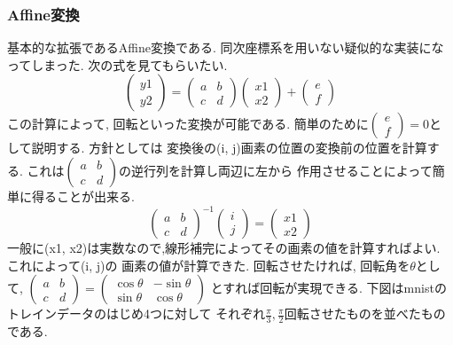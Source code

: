 \documentclass[a4paper,11pt]{jsarticle}
\begin{document}
\subsubsection*{Affine変換}
基本的な拡張であるAffine変換である. 同次座標系を用いない疑似的な実装になってしまった.
次の式を見てもらいたい.
$$
  \begin{pmatrix}
    y1 \\
    y2
  \end{pmatrix}
  = \begin{pmatrix}
    a & b \\
    c & d
  \end{pmatrix}
  \begin{pmatrix}
    x1 \\
    x2
  \end{pmatrix}
  + \begin{pmatrix}
    e \\
    f
  \end{pmatrix}
$$
この計算によって, 回転といった変換が可能である. 簡単のために$
  \begin{pmatrix}
    e \\
    f
  \end{pmatrix} = 0$として説明する.
方針としては
変換後の(i, j)画素の位置の変換前の位置を計算する. これは$\begin{pmatrix}
    a & b \\
    c & d
  \end{pmatrix}$の逆行列を計算し両辺に左から
作用させることによって簡単に得ることが出来る.
$$
  \begin{pmatrix}
    a & b \\
    c & d
  \end{pmatrix}^{-1}
  \begin{pmatrix}
    i \\
    j
  \end{pmatrix} = \begin{pmatrix}
    x1 \\
    x2
  \end{pmatrix}
$$
一般に(x1, x2)は実数なので,線形補完によってその画素の値を計算すればよい. これによって(i, j)の
画素の値が計算できた. 回転させたければ, 回転角を$\theta$として,
$\begin{pmatrix}
    a & b \\
    c & d
  \end{pmatrix} =\begin{pmatrix}
    \cos\theta & -\sin\theta \\
    \sin\theta & \cos\theta
  \end{pmatrix}$
とすれば回転が実現できる. 下図はmnistのトレインデータのはじめ4つに対して
それぞれ$\frac{\pi}{3}, \frac{\pi}{2}$回転させたものを並べたものである.
\end{document}
